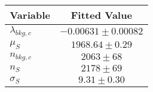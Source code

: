 \begin{tabular}[t]{lc}
\hline
Variable &Fitted Value\\
\hline\hline
$\lambda_{bkg,c}$&$-0.00631\pm0.00082$\\
\hline
$\mu_{S}$&$1968.64\pm0.29$\\
\hline
$n_{bkg,c}$&$2063\pm68$\\
\hline
$n_{S}$&$2178\pm69$\\
\hline
$\sigma_{S}$&$9.31\pm0.30$\\
\hline
\end{tabular}